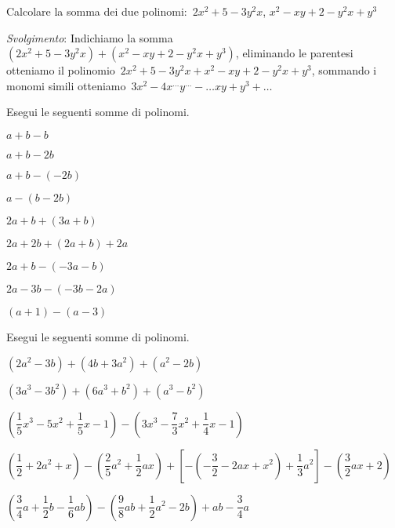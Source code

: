 \begin{esercizio}
\label{ese:10.12}
Calcolare la somma dei due polinomi:~$2x^2+5-3y^2x$, $x^2-xy+2-y^2x+y^3$

\emph{Svolgimento}: Indichiamo la somma~$(2x^2+5-3y^2x)+(x^2-xy+2-y^2x+y^3)$, 
eliminando le parentesi otteniamo
il polinomio~$2x^2+5-3y^2x+x^2-xy+2-y^2x+y^3$, sommando i monomi simili 
otteniamo~$3x^2-4x^{\ldots}y^{\ldots}-\ldots xy+y^3+\ldots$
\end{esercizio}
\begin{esercizio}
\label{ese:10.13}
 Esegui le seguenti somme di polinomi.
\begin{multicols}{3}
 \begin{enumeratea}
 \item $a+b-b$
 \item $a+b-2b$
 \item $a+b-(-2b)$
 \item $a-(b-2b)$
 \item $2a+b+(3a+b)$
 \item $2a+2b+(2a+b)+2a$
 \item $2a+b-(-3a-b)$
 \item $2a-3b-(-3b-2a)$
 \item $(a+1)-(a-3)$
\end{enumeratea}
\end{multicols}
\end{esercizio}

\begin{esercizio}[\Ast]
\label{ese:10.14}
 Esegui le seguenti somme di polinomi.

 \begin{enumeratea}
 \item $\left(2a^{2}-3b\right)+\left(4b+3a^{2}\right)+\left(a^{2}-2b\right)$
 \item 
$\left(3a^{3}-3b^{2}\right)+\left(6a^{3}+b^{2}\right)+\left(a^{3}-b^{2}\right)$
 \item 
$\left(\dfrac{1}{5}x^{3}-5x^{2}+\dfrac{1}{5}x-1\right)-\left(3x^{3}-\dfrac{7}{3}
x^{2}+\dfrac{1}{4}x-1\right)$
 \item 
$\left(\dfrac{1}{2}+2a^{2}+x\right)-\left(\dfrac{2}{5}a^{2}+\dfrac{1}{2}{ax}
\right)+\left[-\left(-{\dfrac{3}{2}}-2{ax}+x^{2}\right)+\dfrac{1}{3}a^{2}\right]
-\left(\dfrac{3}{2}{ax}+2\right)$
 \item 
$\left(\dfrac{3}{4}a+\dfrac{1}{2}b-\dfrac{1}{6}{ab}\right)-\left(\dfrac{9}{8}{ab
}+\dfrac{1}{2}a^{2}-2b\right)+{ab}-\dfrac{3}{4}a$
\end{enumeratea}
\end{esercizio}


